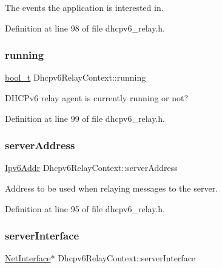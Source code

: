 The events the application is interested in. 



Definition at line 98 of file dhcpv6\+\_\+relay.\+h.

\mbox{\label{structDhcpv6RelayContext_a4d6dd0abf3071d9e44c401004deef46b}} 
\subsubsection{\texorpdfstring{running}{running}}
{\footnotesize\ttfamily \hyperlink{compiler__port_8h_a812d16e5494522586b3784e55d479912}{bool\+\_\+t} Dhcpv6\+Relay\+Context\+::running}



D\+H\+C\+Pv6 relay agent is currently running or not? 



Definition at line 99 of file dhcpv6\+\_\+relay.\+h.

\mbox{\label{structDhcpv6RelayContext_af99b4fbe7d100b5356cd7aa2c587eda4}} 
\subsubsection{\texorpdfstring{server\+Address}{serverAddress}}
{\footnotesize\ttfamily \hyperlink{ipv6_8h_aed0cbc40c61ed5b4fb681ebc55237e89}{Ipv6\+Addr} Dhcpv6\+Relay\+Context\+::server\+Address}



Address to be used when relaying messages to the server. 



Definition at line 95 of file dhcpv6\+\_\+relay.\+h.

\mbox{\label{structDhcpv6RelayContext_ac4e2670737b844e0484e24a13d01d914}} 
\subsubsection{\texorpdfstring{server\+Interface}{serverInterface}}
{\footnotesize\ttfamily \hyperlink{net_8h_a2234db8911a1148c9159979d8f5e0d6b}{Net\+Interface}$\ast$ Dhcpv6\+Relay\+Context\+::server\+Interface}



